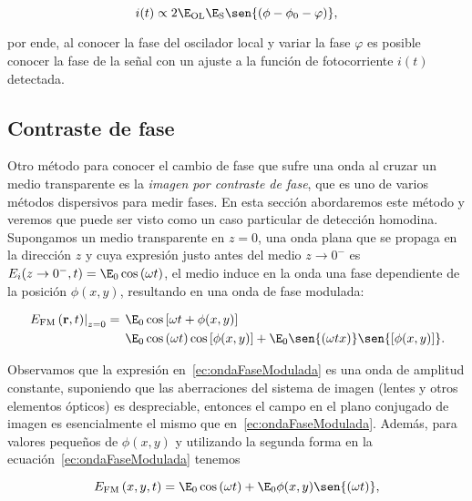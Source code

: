 \begin{equation}
\label{ec:fotocorrienteFase}
i(t)\propto2\E_\sm{\mathrm{OL}}\E_\sm{\mathrm{S}}\sen{\left(\phi-\phi_\sm{0}-\varphi\right)},
\end{equation}

por ende, al conocer la fase del oscilador local y variar la fase $\varphi$ es posible conocer la fase de la señal con un ajuste a la función de fotocorriente $i(t)$ detectada.

\subsection{\label{sub:contrasteFase}Contraste de fase}

Otro método para conocer el cambio de fase que sufre una onda al cruzar un medio transparente es la \emph{imagen por contraste de fase}, que es uno de varios métodos dispersivos para medir fases. En esta sección abordaremos este método y veremos que puede ser visto como un  caso particular de detección homodina. Supongamos un medio transparente en $z=0$, una onda plana que se propaga en la dirección $z$ y cuya expresión justo antes del medio $z\to0^{-}$ es $E_\sm{i}(z\to0^{-},t)=\E_\sm{0}\cos{\left(\omega t\right)}$, el medio induce en la onda una fase dependiente de la posición $\phi(x,y)$, resultando en una onda de fase modulada:

\begin{equation}
\label{ec:ondaFaseModulada}
\begin{split}
\left.E_\sm{\mathrm{FM}}\left(\vektor{r},t\right)\right|_\sm{z=0}= & \hspace{1.5mm}\E_ \sm{0}\cos{\left[\omega t+\phi(x,y)\right]}\\
& \hspace{1.5mm}\E_\sm{0}\cos{\left(\omega t\right)}\cos{\left[\phi(x,y)\right]}+\E_\sm{0}\sen{\left(\omega tx\right)}\sen{\left[\phi(x,y)\right]}.
\end{split}
\end{equation}

Observamos que la expresión en~\ref{ec:ondaFaseModulada} es una onda de amplitud constante, suponiendo que las aberraciones del sistema de imagen (lentes y otros elementos ópticos) es despreciable, entonces el campo en el plano conjugado de imagen es esencialmente el mismo que en~\ref{ec:ondaFaseModulada}. Además, para valores pequeños de $\phi(x,y)$ y utilizando la segunda forma en la ecuación~\ref{ec:ondaFaseModulada} tenemos

\begin{equation}
\label{ec:ondaFasePequena}
E_\sm{\mathrm{FM}}\left(x,y,t\right)=\E_\sm{0}\cos{\left(\omega t\right)}+\E_\sm{0}\phi(x,y)\sen{\left(\omega t\right)},	
\end{equation}

